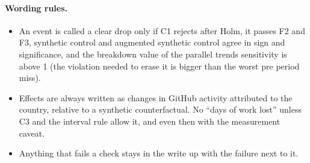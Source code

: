 \paragraph{Wording rules.}
\begin{itemize}
\item An event is called a clear drop only if C1 rejects after Holm, it passes F2 and F3, synthetic control and augmented synthetic control agree in sign and significance, and the breakdown value of the parallel trends sensitivity is above 1 (the violation needed to erase it is bigger than the worst pre period miss).
\item Effects are always written as changes in GitHub activity attributed to the country, relative to a synthetic counterfactual. No ``days of work lost'' unless C3 and the interval rule allow it, and even then with the measurement caveat.
\item Anything that fails a check stays in the write up with the failure next to it.
\end{itemize}
